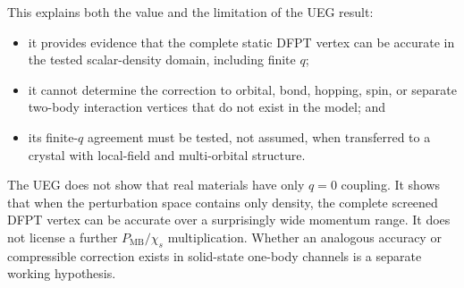 This explains both the value and the limitation of the UEG result:

\begin{itemize}
  \item it provides evidence that the complete static DFPT vertex can be accurate
  in the tested scalar-density domain, including finite $q$;
  \item it cannot determine the correction to orbital, bond, hopping, spin, or
  separate two-body interaction vertices that do not exist in the model; and
  \item its finite-$q$ agreement must be tested, not assumed, when transferred to
  a crystal with local-field and multi-orbital structure.
\end{itemize}

\begin{keypoint}
The UEG does not show that real materials have only $q=0$ coupling.  It shows that
when the perturbation space contains only density, the complete screened DFPT
vertex can be accurate over a surprisingly wide momentum range.  It does not
license a further $P_{\mathrm{MB}}/\chi_s$ multiplication.  Whether an analogous
accuracy or compressible correction exists in solid-state one-body channels is a
separate working hypothesis.
\end{keypoint}
